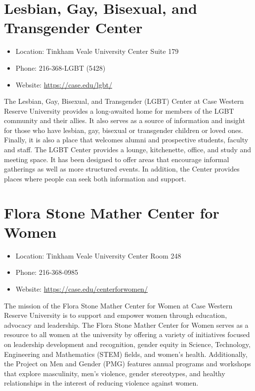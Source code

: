 \documentclass[
]{book}
\providecommand{\tightlist}{%
  \setlength{\itemsep}{0pt}\setlength{\parskip}{0pt}}
\begin{document}
\hypertarget{lesbian-gay-bisexual-and-transgender-center}{%
\section{Lesbian, Gay, Bisexual, and Transgender Center}\label{lesbian-gay-bisexual-and-transgender-center}}

\begin{itemize}
\tightlist
\item
  Location: Tinkham Veale University Center Suite 179
\item
  Phone: 216-368-LGBT (5428)
\item
  Website: \url{https://case.edu/lgbt/}
\end{itemize}

The Lesbian, Gay, Bisexual, and Transgender (LGBT) Center at Case Western Reserve University provides a long-awaited home for members of the LGBT community and their allies. It also serves as a source of information and insight for those who have lesbian, gay, bisexual or transgender children or loved ones. Finally, it is also a place that welcomes alumni and prospective students, faculty and staff. The LGBT Center provides a lounge, kitchenette, office, and study and meeting space. It has been designed to offer areas that encourage informal gatherings as well as more structured events. In addition, the Center provides places where people can seek both information and support.

\hypertarget{flora-stone-mather-center-for-women}{%
\section{Flora Stone Mather Center for Women}\label{flora-stone-mather-center-for-women}}

\begin{itemize}
\tightlist
\item
  Location: Tinkham Veale University Center Room 248
\item
  Phone: 216-368-0985
\item
  Website: \url{https://case.edu/centerforwomen/}
\end{itemize}

The mission of the Flora Stone Mather Center for Women at Case Western Reserve University is to support and empower women through education, advocacy and leadership. The Flora Stone Mather Center for Women serves as a resource to all women at the university by offering a variety of initiatives focused on leadership development and recognition, gender equity in Science, Technology, Engineering and Mathematics (STEM) fields, and women's health. Additionally, the Project on Men and Gender (PMG) features annual programs and workshops that explore masculinity, men's violence, gender stereotypes, and healthy relationships in the interest of reducing violence against women.
\end{document}
